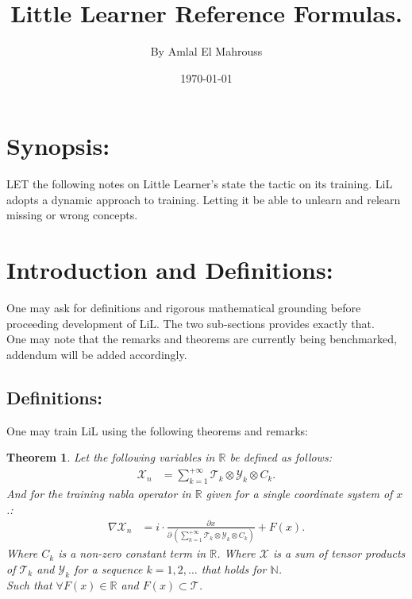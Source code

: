\documentclass[10pt]{article}
\title{%
	\vspace{-1.5em}%
	\large\textbf{Little Learner Reference Formulas.}%
}
\author{By Amlal El Mahrouss}
\date{\today}
\theoremstyle{plain}
\newtheorem{theorem}{Theorem}[section]
\theoremstyle{definition}
\theoremstyle{remark}
\begin{document}

\maketitle
\tableofcontents
\newpage

\section{Synopsis:}

\lettrine[lines=1, lhang=0.1, loversize=0.2]{L}ET the following notes on Little Learner's state the tactic on its training. LiL adopts a dynamic approach to training. Letting it be able to unlearn and relearn missing or wrong concepts.

\section{Introduction and Definitions:}

One may ask for definitions and rigorous mathematical grounding before proceeding development of LiL. The two sub-sections provides exactly that.\\
One may note that the remarks and theorems are currently being benchmarked, addendum will be added accordingly.

\subsection{Definitions:}

One may train LiL using the following theorems and remarks:

\begin{theorem}
Let the following variables in $\mathbb{R}$ be defined as follows:
\begin{align*}
    \mathcal{X}_n &= \sum_{k=1}^{+\infty} \mathcal{T}_k \otimes \mathcal{Y}_k \otimes C_k.
\end{align*}
And for the training nabla operator in $\mathbb{R}$ given for a single coordinate system of $x$.:
\begin{align*}
	\nabla \mathcal{X}_n &= i \cdot \frac{\partial x}{\partial \, (\sum_{k=1}^{+\infty} \mathcal{T}_k \otimes \mathcal{Y}_k \otimes C_k)} + F(x).
\end{align*}
Where $C_k$ is a non-zero constant term in $\mathbb{R}$. Where $\mathcal{X}$ is a sum of tensor products of $\mathcal{T}_k$ and $\mathcal{Y}_k$ for a sequence $k=1, 2, \ldots$ that holds for $\mathbb{N}$.\\
Such that $\forall F(x) \in \mathbb{R}$ and $F(x) \subset \mathcal{T}$.
\end{theorem}
\end{document}
